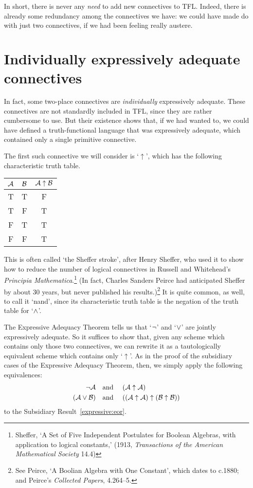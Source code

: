 In short, there is never any \emph{need} to add new connectives to TFL. Indeed, there is already some redundancy among the connectives we have: we could have made do with just two connectives, if we had been feeling really austere.

\section{Individually expressively adequate connectives}

In fact, some two-place connectives are \emph{individually} expressively adequate. These connectives are not standardly included in TFL, since they are rather cumbersome to use. But their existence shows that, if we had wanted to, we could have defined a truth-functional language that was expressively adequate, which contained only a single primitive connective.

The first such connective we will consider is `$\uparrow$', which has the following characteristic truth table. 
\begin{center}
\begin{tabular}{c c | c}
$\mathcal{A}$ & $\mathcal{B}$ & $\mathcal{A} \mathrel{\uparrow} \mathcal{B}$\\
\hline
 T & T & F \\
 T & F & T \\
 F & T & T  \\
 F & F & T
\end{tabular}
\end{center}
 This is often called `the Sheffer stroke', after Henry Sheffer, who used it to show how to reduce the number of logical connectives in Russell and Whitehead's \emph{Principia Mathematica}.\footnote{Sheffer, `A Set of Five Independent Postulates for Boolean Algebras, with application to logical constants,' (1913, \emph{Transactions of the American Mathematical Society} 14.4)} (In fact, Charles Sanders Peirce had anticipated Sheffer by about 30 years, but never published his results.)\footnote{See Peirce, `A Boolian Algebra with One Constant', which dates to c.1880; and Peirce's \emph{Collected Papers}, 4.264--5.} It is quite common, as well, to call it `nand', since its characteristic truth table is the negation of the truth table for `$\wedge$'.

The Expressive Adequacy Theorem tells us that `$\neg$' and `$\vee$' are jointly expressively adequate. So it suffices to show that, given any scheme which contains only those two connectives, we can rewrite it as a tautologically equivalent scheme which contains only `$\uparrow$'. As in the proof of the subsidiary cases of the Expressive Adequacy Theorem, then, we simply apply the following equivalences:
		\begin{align*}
			\neg \mathcal{A} &\text{\quad and \quad} (\mathcal{A} \uparrow \mathcal{A})\\
			(\mathcal{A} \vee \mathcal{B}) & \text{\quad and \quad} ((\mathcal{A} \uparrow \mathcal{A}) \uparrow (\mathcal{B} \uparrow \mathcal{B}))
		\end{align*}
to the Subsidiary Result~\ref{expressive:eor}.

